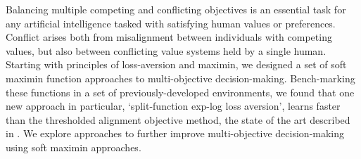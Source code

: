 
Balancing multiple competing and conflicting objectives is an essential task for any artificial intelligence tasked with satisfying human values or preferences. Conflict arises both from misalignment between individuals with competing values, but also between conflicting value systems held by a single human. Starting with principles of loss-aversion and maximin, we designed a set of soft maximin function approaches to multi-objective decision-making. Bench-marking these functions in a set of previously-developed environments, we found that one new approach in particular, `split-function exp-log loss aversion', learns faster than the thresholded alignment objective method, the state of the art described in \cite{vamplew_potential-based_2021}. We explore approaches to further improve multi-objective decision-making using soft maximin approaches.

